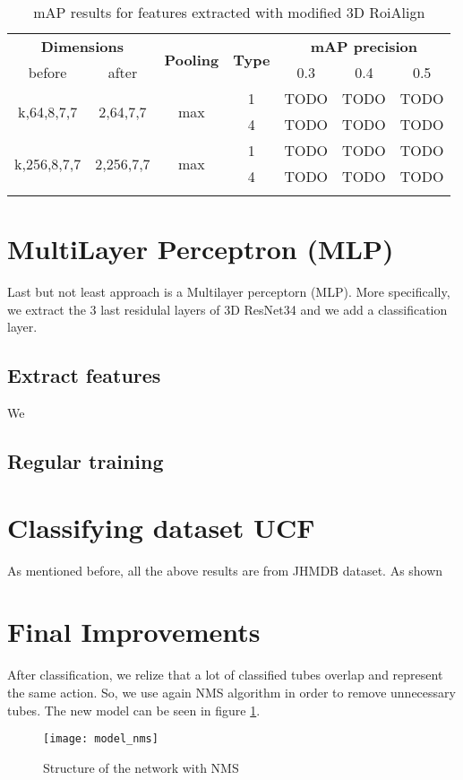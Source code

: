 \begin{center}
\begin{longtable}{||c | c| c| c||c c c||}

  \hline
 \multicolumn{2}{||c|}{\textbf{Dimensions}} & \multirow{2}{*}{\textbf{Pooling}} &\multirow{2}{*}{ \textbf{Type}} &\multicolumn{3}{|c||}{\textbf{mAP precision}}\\

  before & after & {} & {} & 0.3 &  0.4 & 0.5 \\
  \hline   \hline

  \multirow{2}{*}{k,64,8,7,7} & \multirow{2}{*}{2,64,7,7} & \multirow{2}{*}{max}  & 1 & TODO & TODO & TODO \\
  \cline{4-7}
  {} & {} & {} & 4 & TODO & TODO & TODO   \\
  \hline   
  \multirow{2}{*}{k,256,8,7,7} & \multirow{2}{*}{2,256,7,7} & \multirow{2}{*}{max}  & 1 & TODO & TODO & TODO \\
  \cline{4-7}
  {} & {} & {} & 4 & TODO & TODO & TODO   \\
  \hline   
  \caption{mAP results for features extracted with modified 3D RoiAlign }
  \label{table:svm_mod_roialign}

\end{longtable} 
\end{center}

\section{MultiLayer Perceptron (MLP)}
Last but not least approach is a Multilayer perceptorn (MLP). More specifically, we extract the 3 last residulal layers of 3D ResNet34
and we add a classification layer.  

\subsection{Extract features}
We

\subsection{Regular training}

\section{Classifying dataset UCF}
As mentioned before, all the above results are from JHMDB dataset. As shown
\section{Final Improvements}
After classification, we relize that a lot of classified tubes overlap and represent the same action. So, we use again NMS algorithm in order
to remove unnecessary tubes. The new model can be seen in figure \ref{fig:network_nms}.

\begin{figure}[h]
  \centering
  \texttt{[image: model\_nms]}
  \caption{Structure of the network with NMS}
  \label{fig:network_nms}
\end{figure}

% 
